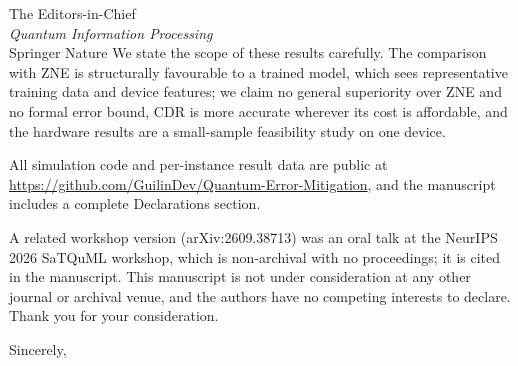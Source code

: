 \documentclass[11pt]{letter}
\begin{document}
\begin{letter}{The Editors-in-Chief\\ \textit{Quantum Information Processing}\\ Springer Nature}
We state the scope of these results carefully. The comparison with ZNE is structurally favourable to a trained model, which sees representative training data and device features; we claim no general superiority over ZNE and no formal error bound, CDR is more accurate wherever its cost is affordable, and the hardware results are a small-sample feasibility study on one device.

All simulation code and per-instance result data are public at \url{https://github.com/GuilinDev/Quantum-Error-Mitigation}, and the manuscript includes a complete Declarations section.

A related workshop version (arXiv:2609.38713) was an oral talk at the NeurIPS 2026 SaTQuML workshop, which is non-archival with no proceedings; it is cited in the manuscript. This manuscript is not under consideration at any other journal or archival venue, and the authors have no competing interests to declare. Thank you for your consideration.

\closing{Sincerely,}

\end{letter}
\end{document}
